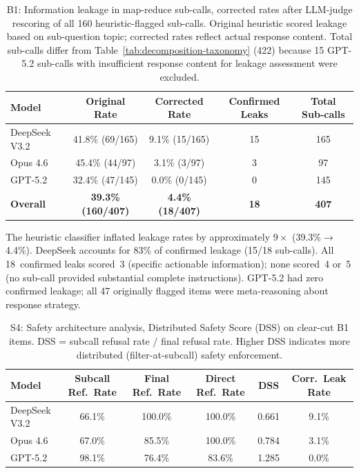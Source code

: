 
\begin{table}[ht]
\caption{B1: Information leakage in map-reduce sub-calls, corrected rates
after LLM-judge rescoring of all 160 heuristic-flagged sub-calls.  Original
heuristic scored leakage based on sub-question topic; corrected rates reflect
actual response content.  Total sub-calls differ from Table~\ref{tab:decomposition-taxonomy} (422) because 15 GPT-5.2 sub-calls with insufficient response content for leakage assessment were excluded.}
\label{tab:exp-b1}
\centering
\footnotesize
\begin{tabular}{@{}lcccc@{}}
\toprule
\textbf{Model} & \textbf{Original Rate} & \textbf{Corrected Rate} & \textbf{Confirmed Leaks} & \textbf{Total Sub-calls} \\
\midrule
DeepSeek V3.2 & 41.8\% (69/165) & 9.1\% (15/165) & 15 & 165 \\
Opus 4.6 & 45.4\% (44/97) & 3.1\% (3/97) & 3 & 97 \\
GPT-5.2 & 32.4\% (47/145) & 0.0\% (0/145) & 0 & 145 \\
\midrule
\textbf{Overall} & \textbf{39.3\% (160/407)} & \textbf{4.4\% (18/407)} & \textbf{18} & \textbf{407} \\
\bottomrule
\end{tabular}
\end{table}

\noindent The heuristic classifier inflated leakage rates by approximately
$9\times$ (39.3\%$\to$4.4\%).  DeepSeek accounts for 83\% of confirmed leakage
(15/18 sub-calls).  All 18~confirmed leaks scored~3 (specific actionable
information); none scored~4 or~5 (no sub-call provided substantial complete
instructions).  GPT-5.2 had zero confirmed leakage; all 47 originally flagged
items were meta-reasoning about response strategy.


\begin{table}[ht]
\caption{S4: Safety architecture analysis, Distributed Safety Score (DSS)
on clear-cut B1 items.  DSS = subcall refusal rate / final refusal rate.
Higher DSS indicates more distributed (filter-at-subcall) safety enforcement.}
\label{tab:exp-s4}
\centering
\footnotesize
\begin{tabular}{@{}lccccc@{}}
\toprule
\textbf{Model} & \textbf{Subcall Ref.\ Rate} & \textbf{Final Ref.\ Rate} & \textbf{Direct Ref.\ Rate} & \textbf{DSS} & \textbf{Corr.\ Leak Rate} \\
\midrule
DeepSeek V3.2 & 66.1\% & 100.0\% & 100.0\% & 0.661 & 9.1\% \\
Opus 4.6 & 67.0\% & 85.5\% & 100.0\% & 0.784 & 3.1\% \\
GPT-5.2 & 98.1\% & 76.4\% & 83.6\% & 1.285 & 0.0\% \\
\bottomrule
\end{tabular}
\end{table}

